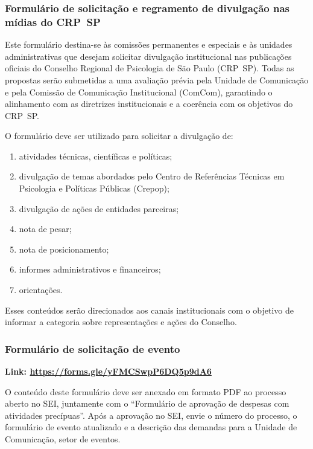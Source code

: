 \subsubsection{Formulário de solicitação e regramento de divulgação nas
  mídias do
  CRP~SP}

Este formulário destina-se às comissões permanentes e especiais e às
unidades administrativas que desejam solicitar divulgação institucional
nas publicações oficiais do Conselho Regional de Psicologia de São Paulo
(CRP~SP). Todas as propostas serão submetidas a uma avaliação prévia
pela Unidade de Comunicação e pela Comissão de Comunicação Institucional
(ComCom), garantindo o alinhamento com as diretrizes institucionais e a
coerência com os objetivos do CRP~SP.

O formulário deve ser utilizado para solicitar a divulgação de:

\begin{enumerate}

  \item
        atividades técnicas, científicas e políticas;
  \item
        divulgação de temas abordados pelo Centro de Referências Técnicas em
        Psicologia e Políticas Públicas (Crepop);
  \item
        divulgação de ações de entidades parceiras;
  \item
        nota de pesar;
  \item
        nota de posicionamento;
  \item
        informes administrativos e financeiros;
  \item
        orientações.
\end{enumerate}

Esses conteúdos serão direcionados aos canais institucionais com o
objetivo de informar a categoria sobre representações e ações do
Conselho.

\subsubsection{Formulário de solicitação de
  evento}

\textbf{Link:
  \href{https://forms.gle/yFMCSwpP6DQ5p9dA6}{https://forms.gle/yFMCSwpP6DQ5p9dA6}}

O conteúdo deste formulário deve ser anexado em formato PDF ao processo
aberto no SEI, juntamente com o ``Formulário de aprovação de despesas
com atividades precípuas''. Após a aprovação no SEI, envie o número do
processo, o formulário de evento atualizado e a descrição das demandas
para a Unidade de Comunicação, setor de eventos.

